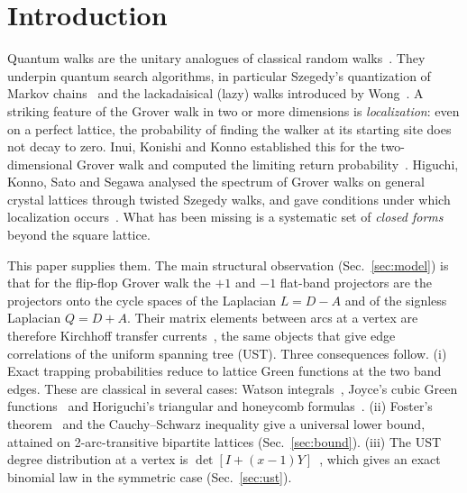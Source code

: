 \documentclass[aps,pra,10pt,twocolumn,superscriptaddress,nofootinbib]{revtex4-2}
\begin{document}
\maketitle

\section{Introduction}
\label{sec:intro}

Quantum walks are the unitary analogues of classical random
walks~\cite{Kempe2003}. They underpin quantum search algorithms, in particular
Szegedy's quantization of Markov chains~\cite{Szegedy2004} and the lackadaisical
(lazy) walks introduced by Wong~\cite{Wong2015}. A striking feature of the Grover
walk in two or more dimensions is \emph{localization}: even on a perfect lattice,
the probability of finding the walker at its starting site does not decay to zero.
Inui, Konishi and Konno established this for the two-dimensional Grover walk
and computed the limiting return probability~\cite{Inui2004}. Higuchi, Konno, Sato
and Segawa analysed the spectrum of Grover walks on general crystal lattices through
twisted Szegedy walks, and gave conditions under which localization
occurs~\cite{Higuchi2014}. What has been missing is a systematic set of
\emph{closed forms} beyond the square lattice.

This paper supplies them. The main structural observation (Sec.~\ref{sec:model}) is
that for the flip-flop Grover walk the $+1$ and $-1$ flat-band projectors are the
projectors onto the cycle spaces of the Laplacian $L=D-A$ and of the signless
Laplacian $Q=D+A$. Their matrix elements between arcs at a vertex are therefore
Kirchhoff transfer currents~\cite{Kirchhoff1847,BurtonPemantle1993}, the same
objects that give edge correlations of the uniform spanning tree (UST). Three
consequences follow.
(i) Exact trapping probabilities reduce to lattice Green functions at the two
band edges. These are classical in several cases: Watson
integrals~\cite{Watson1939,GlasserZucker1977}, Joyce's cubic Green
functions~\cite{Joyce1994,Joyce1998} and Horiguchi's triangular and honeycomb
formulas~\cite{Horiguchi1972}.
(ii) Foster's theorem~\cite{Foster1949} and the Cauchy--Schwarz inequality give a
universal lower bound, attained on 2-arc-transitive bipartite lattices
(Sec.~\ref{sec:bound}).
(iii) The UST degree distribution at a vertex is
$\det[I+(x-1)Y]$~\cite{BurtonPemantle1993}, which gives an exact binomial law in the
symmetric case (Sec.~\ref{sec:ust}).
\end{document}
